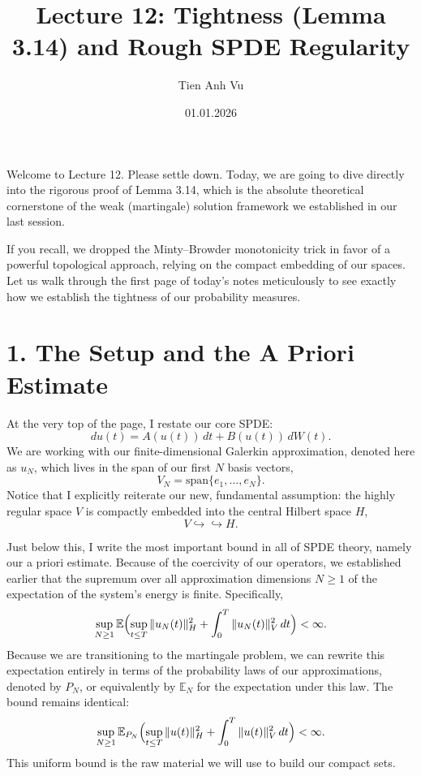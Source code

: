 \documentclass[11pt]{article}
\title{Lecture 12: Tightness (Lemma 3.14) and Rough SPDE Regularity}
\date{01.01.2026}
\author{Tien Anh Vu}
\theoremstyle{definition}
\theoremstyle{remark}
\begin{document}
\maketitle

Welcome to Lecture 12. Please settle down. Today, we are going to dive directly into the rigorous proof of Lemma 3.14, which is the absolute theoretical cornerstone of the weak (martingale) solution framework we established in our last session.

If you recall, we dropped the Minty--Browder monotonicity trick in favor of a powerful topological approach, relying on the compact embedding of our spaces. Let us walk through the first page of today's notes meticulously to see exactly how we establish the tightness of our probability measures.

\section*{1. The Setup and the A Priori Estimate}
At the very top of the page, I restate our core SPDE:
\[
  du(t)=A(u(t))\,dt+B(u(t))\,dW(t).
\]
We are working with our finite-dimensional Galerkin approximation, denoted here as $u_N$, which lives in the span of our first $N$ basis vectors,
\[
  V_N=\mathrm{span}\{e_1,\dots,e_N\}.
\]
Notice that I explicitly reiterate our new, fundamental assumption: the highly regular space $V$ is compactly embedded into the central Hilbert space $H$,
\[
  V\hookrightarrow\hookrightarrow H.
\]

Just below this, I write the most important bound in all of SPDE theory, namely our a priori estimate. Because of the coercivity of our operators, we established earlier that the supremum over all approximation dimensions $N\ge 1$ of the expectation of the system's energy is finite. Specifically,
\[
  \sup_{N\ge 1}\mathbb E\Bigl(
  \sup_{t\le T}\|u_N(t)\|_H^2+\int_0^T \|u_N(t)\|_V^2\,dt
  \Bigr)<\infty.
\]
Because we are transitioning to the martingale problem, we can rewrite this expectation entirely in terms of the probability laws of our approximations, denoted by $P_N$, or equivalently by $\mathbb E_N$ for the expectation under this law. The bound remains identical:
\[
  \sup_{N\ge 1}\mathbb E_{P_N}\Bigl(
  \sup_{t\le T}\|u(t)\|_H^2+\int_0^T \|u(t)\|_V^2\,dt
  \Bigr)<\infty.
\]
This uniform bound is the raw material we will use to build our compact sets.
\end{document}
